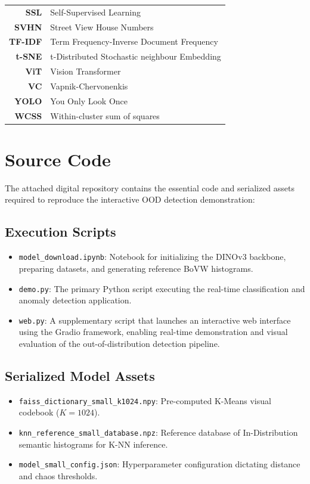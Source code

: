 \documentclass[oneside]{ctuthesis}
\begin{document}
\begin{center}
\begin{tabular}{r p{25em}}
        \textbf{SSL}    & Self-Supervised Learning \\
        \textbf{SVHN}   & Street View House Numbers \\
        \textbf{TF-IDF} & Term Frequency-Inverse Document Frequency \\
        \textbf{t-SNE}  & t-Distributed Stochastic neighbour Embedding \\
        \textbf{ViT}    & Vision Transformer \\
        \textbf{VC}     & Vapnik-Chervonenkis \\
        \textbf{YOLO}   & You Only Look Once \\
        \textbf{WCSS}   & Within-cluster sum of squares \\
    \end{tabular}
\end{center}

\chapter{Source Code}
\label{source_code}

The attached digital repository contains the essential code and serialized assets required to reproduce the interactive OOD detection demonstration:

\section*{Execution Scripts}
\begin{itemize}
    \item \texttt{model\_download.ipynb}: Notebook for initializing the DINOv3 backbone, preparing datasets, and generating reference BoVW histograms.
    \item \texttt{demo.py}: The primary Python script executing the real-time classification and anomaly detection application.
    \item \texttt{web.py}: A supplementary script that launches an interactive web interface using the Gradio framework, enabling real-time demonstration and visual evaluation of the out-of-distribution detection pipeline.
\end{itemize}

\section*{Serialized Model Assets}
\begin{itemize}
    \item \texttt{faiss\_dictionary\_small\_k1024.npy}: Pre-computed K-Means visual codebook ($K=1024$).
    \item \texttt{knn\_reference\_small\_database.npz}: Reference database of In-Distribution semantic histograms for K-NN inference.
    \item \texttt{model\_small\_config.json}: Hyperparameter configuration dictating distance and chaos thresholds.
\end{itemize}
\end{document}
